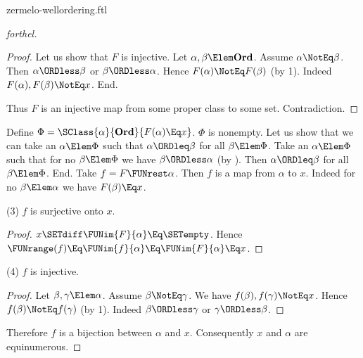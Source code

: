 \documentclass{stex}
\newcommand\Ord{\textbf{Ord}}
\begin{document}
\begin{smodule}{zermelo-wellordering.ftl}
\begin{proof}[forthel]
\begin{proof}
    Let us show that $F$ is injective.
      Let $\alpha, \beta \Elem \Ord$.
      Assume $\alpha \NotEq \beta$.
      Then $\alpha \ORDless \beta$ or $\beta \ORDless \alpha$.
      Hence $F(\alpha) \NotEq F(\beta)$ (by 1).
      Indeed $F(\alpha), F(\beta) \NotEq x$.
    End.

    Thus $F$ is an injective map from some proper class to some set.
    Contradiction.
  \end{proof}

  Define $\Phi = \SClass{\alpha}{\Ord}{F(\alpha) \Eq x}$.
  $\Phi$ is nonempty.
  Let us show that we can take an $\alpha \Elem \Phi$ such that $\alpha \ORDleq \beta$ for all $\beta \Elem \Phi$.
    Take an $\alpha \Elem \Phi$ such that for no $\beta \Elem \Phi$ we have $\beta \ORDless \alpha$ (by ).
    Then $\alpha \ORDleq \beta$ for all $\beta \Elem \Phi$.
  End.
  Take $f = F \FUNrest \alpha$.
  Then $f$ is a map from $\alpha$ to $x$.
  Indeed for no $\beta \Elem \alpha$ we have $F(\beta) \Eq x$.

  (3) $f$ is surjective onto $x$.
  \begin{proof}
    $x \SETdiff \FUNim{F}{\alpha} \Eq \SETempty$.
    Hence $\FUNrange(f)
      \Eq \FUNim{f}{\alpha}
      \Eq \FUNim{F}{\alpha}
      \Eq x$.
  \end{proof}

  (4) $f$ is injective.
  \begin{proof}
    Let $\beta, \gamma \Elem \alpha$.
    Assume $\beta \NotEq \gamma$.
    We have $f(\beta), f(\gamma) \NotEq x$.
    Hence $f(\beta) \NotEq f(\gamma)$ (by 1).
    Indeed $\beta \ORDless \gamma$ or $\gamma \ORDless \beta$.
  \end{proof}

  Therefore $f$ is a bijection between $\alpha$ and $x$.
  Consequently $x$ and $\alpha$ are equinumerous.
\end{proof}

\printbibliography
{}
\end{smodule}
\end{document}
